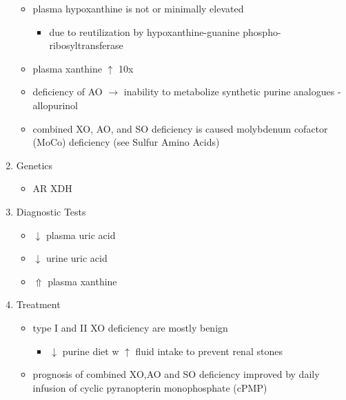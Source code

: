 \documentclass[12pt]{scrartcl}
\begin{document}
\begin{enumerate}

\begin{itemize}
\item plasma hypoxanthine is not or minimally elevated
\begin{itemize}
\item due to reutilization by hypoxanthine-guanine phospho-ribosyltransferase
\end{itemize}
\item plasma xanthine \(\uparrow\) 10x
\item deficiency of AO \(\to\) inability to metabolize synthetic purine
analogues - allopurinol
\item combined XO, AO, and SO deficiency is caused molybdenum cofactor
(MoCo) deficiency (see Sulfur Amino Acids)
\end{itemize}

\item Genetics
\label{sec:org2671ef2}
\begin{itemize}
\item AR XDH
\end{itemize}

\item Diagnostic Tests
\label{sec:org5975daa}
\begin{itemize}
\item \(\downarrow\) plasma uric acid
\item \(\downarrow\) urine uric acid
\item \(\Uparrow\) plasma xanthine
\end{itemize}

\item Treatment
\label{sec:org13f11a5}
\begin{itemize}
\item type I and II XO deficiency are mostly benign
\begin{itemize}
\item \(\downarrow\) purine diet w \(\uparrow\) fluid intake to prevent renal stones
\end{itemize}
\item prognosis of combined XO,AO and SO deficiency improved by daily
infusion of cyclic pyranopterin monophosphate (cPMP)
\end{itemize}
\end{enumerate}
\end{document}
